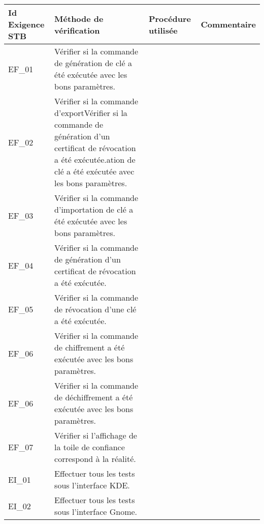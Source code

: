 \documentclass{../res/univ-projet}
\begin{document}
\begin{center}
    \begin{tabular}{|p{2.8cm}|p{4.2cm}|p{3cm}|p{5cm}|}
      \hline
      Id Exigence STB & Méthode de vérification & Procédure utilisée & Commentaire\\ \hline
      EF\_01 & Vérifier si la commande de génération de clé a été exécutée avec les bons paramètres. &  & \\ \hline
      EF\_02 & Vérifier si la commande d'exportVérifier si la commande de génération d'un certificat de révocation a été exécutée.ation de clé a été exécutée avec les bons paramètres. &  & \\ \hline
      EF\_03 & Vérifier si la commande d'importation de clé a été exécutée avec les bons paramètres. &  & \\ \hline
      EF\_04 & Vérifier si la commande de génération d'un certificat de révocation a été exécutée. &  & \\ \hline
      EF\_05 & Vérifier si la commande de révocation d'une clé a été exécutée. &  & \\ \hline
      EF\_06 & Vérifier si la commande de chiffrement a été exécutée avec les bons paramètres. &  & \\ \hline
      EF\_06 & Vérifier si la commande de déchiffrement a été exécutée avec les bons paramètres. &  & \\ \hline
      EF\_07 & Vérifier si l'affichage de la toile de confiance correspond à la réalité. &  & \\ \hline
      EI\_01 & Effectuer tous les tests sous l'interface KDE. &  & \\ \hline
      EI\_02 & Effectuer tous les tests sous l'interface Gnome. &  & \\ \hline
    \end{tabular}  
\end{center}
\end{document}
